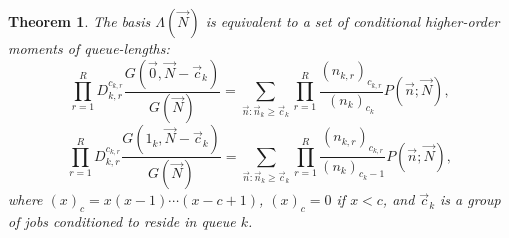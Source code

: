 \documentclass[journal,twocolumn,9.5pt]{IEEEtran}
\newtheorem{theorem}{Theorem}
\renewcommand{\Pr}{P}
\begin{document}
\begin{theorem}
\label{THM:moments}
{\em
The basis $\Lambda(\vec N)$ is equivalent to a set of conditional higher-order moments of queue-lengths:
\begin{equation*}\label{EQU:probint1}\prod_{r=1}^R D^{c_{k,r}}_{k,r}\frac{G(\vec 0,\vec N-\vec c_k)}{G(\vec N)}=\sum_{\vec n:\vec n_k\geq \vec c_k} \prod_{r=1}^R \frac{(n_{k,r})_{c_{k,r}}}{(n_k)_{c_k}}\Pr(\vec n;\vec N),\end{equation*}
\begin{equation*}\label{EQU:probint2}\prod_{r=1}^R D^{c_{k,r}}_{k,r}\frac{G(1_k,\vec N-\vec c_k)}{G(\vec N)}=\sum_{\vec n:\vec n_k\geq \vec c_k} \prod_{r=1}^R \frac{(n_{k,r})_{c_{k,r}}}{(n_k)_{c_k-1}}\Pr(\vec n;\vec N),\end{equation*}
where $(x)_{c}=x(x-1)\cdots (x-c+1)$, $(x)_c=0$ if $x< c$, and $\vec c_k$ is a group of jobs conditioned to reside in queue $k$.
}\end{theorem}
\end{document}
